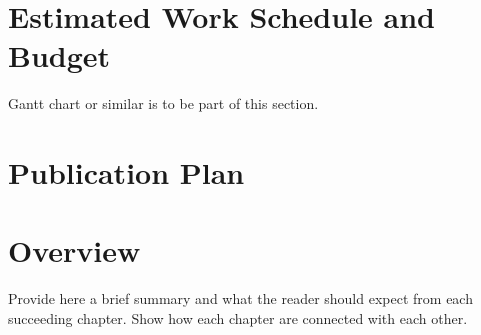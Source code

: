 \blindtext


\ifFinished
\else

\section{Estimated Work Schedule and Budget}

Gantt chart or similar is to be part of this section.

\blindtext

\section{Publication Plan}
\blindtext

\fi


\section{Overview}

Provide here a brief summary and what the reader should expect from each succeeding chapter.  Show how each chapter are connected with each other.

